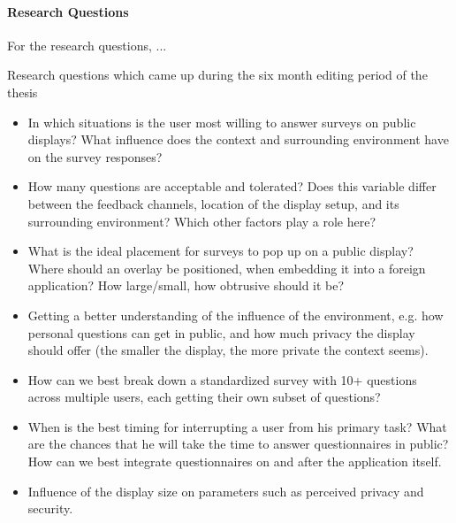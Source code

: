 \paragraph{Research Questions}

	For the research questions, ...

	Research questions which came up during the six month editing period of the thesis

	\begin{itemize}
	\item In which situations is the user most willing to answer surveys on public displays? What influence does the context and surrounding environment have on the survey responses?
	\item How many questions are acceptable and tolerated? Does this variable differ between the feedback channels, location of the display setup, and its surrounding environment? Which other factors play a role here?
	\item What is the ideal placement for surveys to pop up on a public display? Where should an overlay be positioned, when embedding it into a foreign application? How large/small, how obtrusive should it be?
	\item Getting a better understanding of the influence of the environment, e.g. how personal questions can get in public, and how much privacy the display should offer (the smaller the display, the more private the context seems).
	\item How can we best break down a standardized survey with 10+ questions across multiple users, each getting their own subset of questions?
	\item When is the best timing for interrupting a user from his primary task? What are the chances that he will take the time to answer questionnaires in public? How can we best integrate questionnaires on and after the application itself.
	\item Influence of the display size on parameters such as perceived privacy and security.
	\end{itemize}









